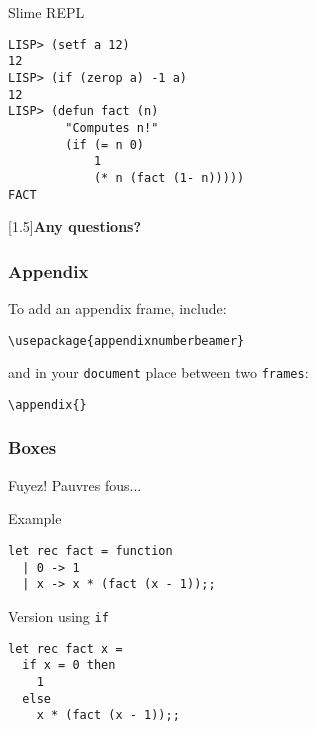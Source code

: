 \documentclass[aspectratio=169]{beamer}
\begin{document}
\begin{frame}[fragile]
  \begin{popup}{.75}
    \begin{macosdarkdialog}{Slime REPL}
      \begin{verbatim}
LISP> (setf a 12)
12
LISP> (if (zerop a) -1 a)
12
LISP> (defun fact (n)
        "Computes n!"
        (if (= n 0)
            1
            (* n (fact (1- n)))))
FACT
      \end{verbatim}
    \end{macosdarkdialog}
  \end{popup}
\end{frame}

\begin{standoutframe}
  \begin{center}
    \scalebox{1.5}[1.5]{\Huge \bfseries Any questions?}
  \end{center}
\end{standoutframe}

\appendix{}

\begin{frame}
  \nocite{*}
  
  
\end{frame}

\begin{frame}
  \frametitle{Appendix}
  To add an appendix frame, include:

\begin{verbatim}
\usepackage{appendixnumberbeamer}
\end{verbatim}

  and in your \texttt{document} place between two \texttt{frames}:

\begin{verbatim}
\appendix{}
\end{verbatim}
\end{frame}

\begin{frame}[fragile]
  \frametitle{Boxes}
  \begin{alertblock}{Fuyez!}
    Pauvres fous...
  \end{alertblock}
  \begin{exampleblock}{Example}
\begin{verbatim}
let rec fact = function
  | 0 -> 1
  | x -> x * (fact (x - 1));;
\end{verbatim}
  \end{exampleblock}
  \begin{block}{Version using \texttt{if}}
 \begin{verbatim}
let rec fact x =
  if x = 0 then
    1
  else
    x * (fact (x - 1));;
\end{verbatim}
  \end{block}
\end{frame}
\end{document}
